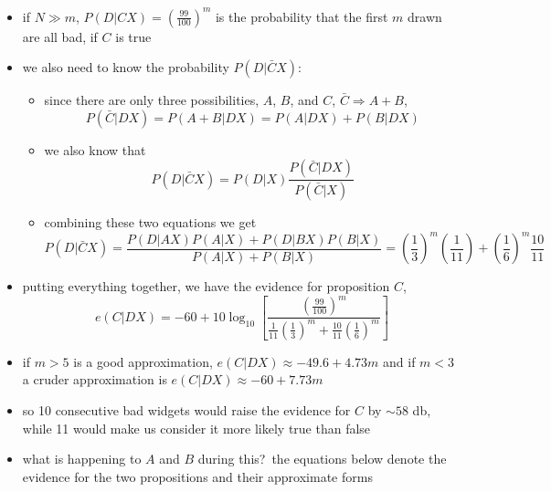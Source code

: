 \documentclass[../jaynes_prob_theory_notes.tex]{subfiles}
\begin{document}
\begin{itemize}
\begin{itemize}
                \item if $N \gg m$, $P(D|CX) = {\left( \frac{99}{100} \right)}^m$ is the probability that the first $m$ drawn are all bad, if $C$ is true
                \item we also need to know the probability $P(D|\bar{C}X)$:
                    \begin{itemize}
                        \item since there are only three possibilities, $A$, $B$, and $C$, $\bar{C} \Rightarrow A+B$,
                            \begin{equation*}
                                P(\bar{C}|DX) = P(A+B|DX) = P(A|DX) + P(B|DX)
                            \end{equation*}
                        \item we also know that
                            \begin{equation*}
                                P(D|\bar{C}X) = P(D|X)\frac{P(\bar{C}|DX)}{P(\bar{C}|X)}
                            \end{equation*}
                        \item combining these two equations we get
                            \begin{equation*}
                            P(D|\bar{C}X) = \frac{P(D|AX)P(A|X) + P(D|BX)P(B|X)}{P(A|X) + P(B|X)} = {\left( \frac{1}{3} \right)}^m {\left( \frac{1}{11} \right)} + {\left( \frac{1}{6} \right)}^m \frac{10}{11}
                            \end{equation*}
                    \end{itemize}
                \item putting everything together, we have the evidence for proposition $C$,
                    \begin{equation*}
                        e(C|DX) = -60 + 10\log_{10} \left[ \frac{{\left( \frac{99}{100} \right)}^m}{\frac{1}{11} {\left( \frac{1}{3} \right)}^m + \frac{10}{11} {\left( \frac{1}{6} \right)}^m} \right]
                    \end{equation*}
                \item if $m > 5$ is a good approximation, $e(C|DX) \approx -49.6 + 4.73m$ and if $m < 3$ a cruder approximation is $e(C|DX) \approx -60 + 7.73m$
                \item so 10 consecutive bad widgets would raise the evidence for $C$ by $\sim 58$ db, while 11 would make us consider it more likely true than false
                \item what is happening to $A$ and $B$ during this?\ the equations below denote the evidence for the two propositions and their approximate forms

\end{itemize}
\end{itemize}
\end{document}
